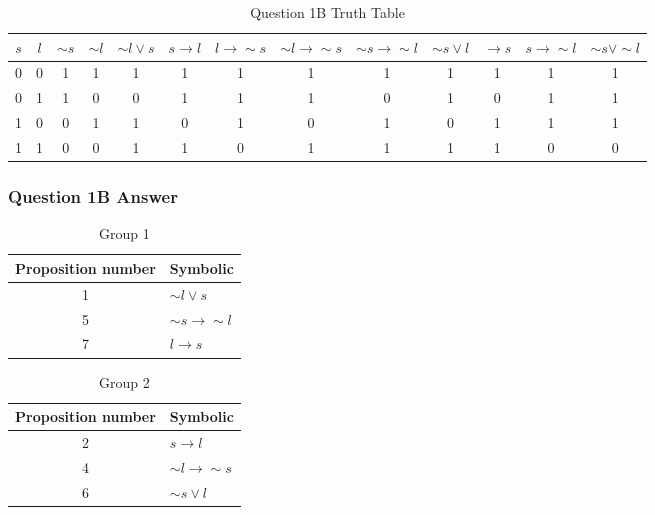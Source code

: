 \documentclass[12pt,a4paper]{article}
\begin{document}
\newpage
\begin{landscape}
\thispagestyle{fancylscape}
\begin{table}[h]
\centering
\caption{Question 1B Truth Table}
\begin{tabular}{c|c|c|c|c|c|c|c|c|c|c|c|c}
$s$ & $l$ & $\sim{s}$ & $\sim{l}$ & $\sim{l} \vee s$ & $s \rightarrow l$ & $l \rightarrow \sim{s}$ & $\sim{l} \rightarrow \sim{s}$ & $\sim{s} \rightarrow \sim{l}$ & $\sim{s} \vee l$ & $ \rightarrow s$ & $s \rightarrow \sim{l}$ & $\sim{s} \vee \sim{l}$ \\
\hline
0 & 0 & 1 & 1 & 1 & 1 & 1 & 1 & 1 & 1 & 1 & 1 & 1 \\
\hline
0 & 1 & 1 & 0 & 0 & 1 & 1 & 1 & 0 & 1 & 0 & 1 & 1 \\
\hline
1 & 0 & 0 & 1 & 1 & 0 & 1 & 0 & 1 & 0 & 1 & 1 & 1 \\
\hline
1 & 1 & 0 & 0 & 1 & 1 & 0 & 1 & 1 & 1 & 1 & 0 & 0 \\
\end{tabular}
\end{table}
\end{landscape}

\newpage
\subsubsection{Question 1B Answer}

\begin{table}[h]
\centering
\caption{Group 1}
\begin{tabular}{c|l}
Proposition number & Symbolic \\
\hline
1 & $\sim{l} \vee s$ \\
\hline
5 & $\sim{s} \rightarrow \sim{l}$ \\
\hline
7 & $l \rightarrow s$ \\
\end{tabular}
\end{table}

\begin{table}[h]
\centering
\caption{Group 2}
\begin{tabular}{c|l}
Proposition number & Symbolic \\
\hline
2 & $s \rightarrow l$ \\
\hline
4 & $\sim{l} \rightarrow \sim{s}$ \\
\hline
6 & $\sim{s} \vee l$ \\
\end{tabular}
\end{table}
\end{document}
